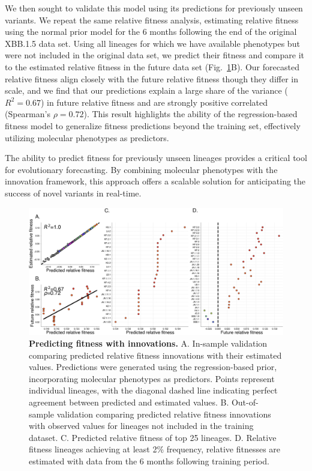 We then sought to validate this model using its predictions for previously unseen variants.
We repeat the same relative fitness analysis, estimating relative fitness using the normal prior model for the 6 months following the end of the original XBB.1.5 data set.
Using all lineages for which we have available phenotypes but were not included in the original data set, we predict their fitness and compare it to the estimated relative fitness in the future data set (Fig.~\ref{fig:predicting-fitness-with-innovations}B).
Our forecasted relative fitness align closely with the future relative fitness though they differ in scale, and we find that our predictions explain a large share of the variance ($R^2 = 0.67$) in future relative fitness and are strongly positive correlated (Spearman's $\rho=0.72$).
This result highlights the ability of the regression-based fitness model to generalize fitness predictions beyond the training set, effectively utilizing molecular phenotypes as predictors.

The ability to predict fitness for previously unseen lineages provides a critical tool for evolutionary forecasting.
By combining molecular phenotypes with the innovation framework, this approach offers a scalable solution for anticipating the success of novel variants in real-time.

\begin{figure}[h]
	\centering
	\includegraphics[width=1.0\textwidth]{./figures/predicting-fitness-with-innovations.png}
	\caption{\textbf{Predicting fitness with innovations.}
	    A. In-sample validation comparing predicted relative fitness innovations with their estimated values.
	    Predictions were generated using the regression-based prior, incorporating molecular phenotypes as predictors.
	    Points represent individual lineages, with the diagonal dashed line indicating perfect agreement between predicted and estimated values.
	    B. Out-of-sample validation comparing predicted relative fitness innovations with observed values for lineages not included in the training dataset.
	    C. Predicted relative fitness of top 25 lineages.
	    D. Relative fitness lineages achieving at least 2\% frequency, relative fitnesses are estimated with data from the 6 months following training period.
	}
	\label{fig:predicting-fitness-with-innovations}
\end{figure}

